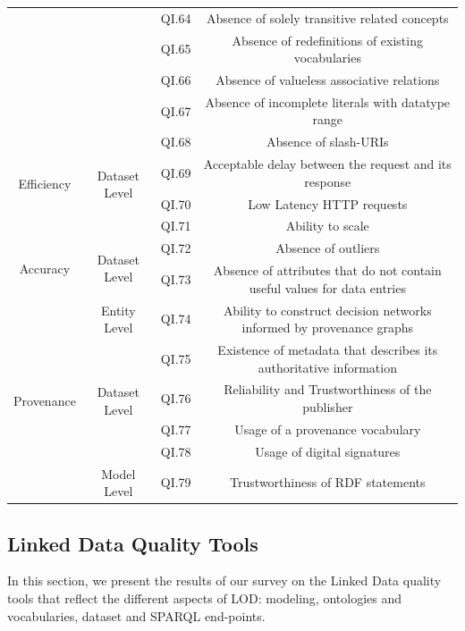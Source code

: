 \documentclass[onecolumn, crcready]{iosart2c}
\begin{document}
\begin{landscape}
\begin{center}
{\begin{longtable}[h]{|c|c|c|c|}
\cline{3-4} 
 &  & QI.64 & Absence of solely transitive related concepts \cite{Mader2012}\tabularnewline
\cline{3-4} 
 &  & QI.65 & Absence of redefinitions of existing vocabularies  \cite{Hogan2010}\tabularnewline
\cline{3-4} 
 &  & QI.66 & Absence of valueless associative relations  \cite{Mader2012}\tabularnewline
\cline{3-4} 
 &  & QI.67 & Absence of incomplete literals with datatype range \cite{Hogan2010}\tabularnewline
\hline 
\hline 
\multirow{4}{*}{Efficiency} & \multirow{4}{*}{Dataset Level} & QI.68 & Absence of slash-URIs \cite{Framework2012}\tabularnewline
\cline{3-4} 
 &  & QI.69 & Acceptable delay between the request and its response \cite{citeulike:2925559}\tabularnewline
\cline{3-4} 
 &  & QI.70 & Low Latency HTTP requests \cite{Framework2012}\tabularnewline
\cline{3-4} 
 &  & QI.71 & Ability to scale \cite{Framework2012}\tabularnewline
\hline 
\hline 
\multirow{2}{*}{Accuracy} & \multirow{2}{*}{Dataset Level} & QI.72 & Absence of outliers \cite{Framework2012}\tabularnewline
\cline{3-4} 
 &  & QI.73 & Absence of attributes that do not contain useful values for data entries \cite{Framework2012}\tabularnewline
\hline
\hline
\multirow{6}{*}{Provenance} & \multirow{1}{*}{Entity Level} & QI.74 & Ability to construct decision networks informed by provenance graphs \cite{Gamble2011}\tabularnewline
\cline{2-4} 
 & \multirow{4}{*}{Dataset Level} & QI.75 & Existence of metadata that describes its authoritative information  \cite{Flouris2012}\tabularnewline
\cline{3-4} 
 &  & QI.76 & Reliability and Trustworthiness of the publisher \cite{Flouris2012}\tabularnewline
\cline{3-4} 
 &  & QI.77 & Usage of a provenance vocabulary\tabularnewline
\cline{3-4} 
 &  & QI.78 & Usage of digital signatures \cite{Framework2012}\tabularnewline
\cline{2-4} 
 & \multirow{1}{*}{Model Level} & QI.79 & Trustworthiness of RDF statements \cite{Hartig09usingweb}\tabularnewline
\hline
\end{longtable}
}
\end{center}
\end{landscape}

\subsection{Linked Data Quality Tools}
In this section, we present the results of our survey on the Linked Data quality tools that reflect the different aspects of LOD: modeling, ontologies and vocabularies, dataset and SPARQL end-points.\\
\end{document}
